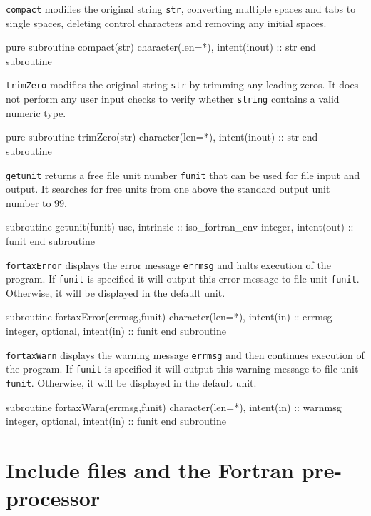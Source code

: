 \documentclass[11pt,thmsa,letter,ukenglish]{article}
\begin{document}
\noindent\texttt{compact} modifies the original string \texttt{str}, converting multiple spaces and tabs to single spaces, deleting control characters and removing any initial spaces.
\begin{fortrancode}
pure subroutine compact(str)
    character(len=*), intent(inout) :: str
end subroutine
\end{fortrancode}

\noindent\texttt{trimZero} modifies the original string \texttt{str} by trimming any leading zeros. It does not perform any user input checks to verify whether \texttt{string} contains a valid numeric type.
\begin{fortrancode}
pure subroutine trimZero(str)
    character(len=*), intent(inout) :: str
end subroutine
\end{fortrancode}

\noindent\texttt{getunit} returns a free file unit number \texttt{funit} that can be used for file input and output. It searches for free units from one above the standard output unit number to 99.
\begin{fortrancode}
subroutine getunit(funit)
    use, intrinsic :: iso_fortran_env
    integer, intent(out) :: funit
end subroutine
\end{fortrancode}

\noindent\texttt{fortaxError} displays the error message \texttt{errmsg} and halts execution of the program. If \texttt{funit} is specified it will output this error message to file unit \texttt{funit}. Otherwise, it will be displayed in the default unit.
\begin{fortrancode}
subroutine fortaxError(errmsg,funit)
    character(len=*),  intent(in) :: errmsg
    integer, optional, intent(in) :: funit
end subroutine
\end{fortrancode}
        
\noindent\texttt{fortaxWarn} displays the warning message \texttt{errmsg} and then continues execution of the program. If \texttt{funit} is specified it will output this warning message to file unit \texttt{funit}. Otherwise, it will be displayed in the default unit.
\begin{fortrancode}
subroutine fortaxWarn(errmsg,funit)
    character(len=*),  intent(in) :: warnmsg
    integer, optional, intent(in) :: funit
end subroutine    
\end{fortrancode}
        
\section{Include files and the Fortran pre-processor}\label{sec:includes}
\end{document}
